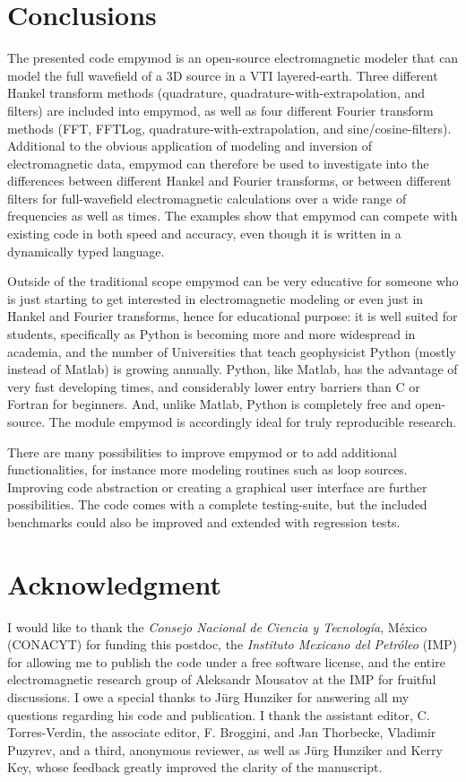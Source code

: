 \documentclass[manuscript,revised]{geophysics}
\begin{document}
\section{Conclusions}

The presented code empymod is an open-source electromagnetic modeler that can
model the full wavefield of a 3D source in a VTI layered-earth. Three different
Hankel transform methods (quadrature, quadrature-with-extrapolation, and
filters) are included into empymod, as well as four different Fourier transform
methods (FFT, FFTLog, quadrature-with-extrapolation, and sine/cosine-filters).
Additional to the obvious application of modeling and inversion of
electromagnetic data, empymod can therefore be used to investigate into the
differences between different Hankel and Fourier transforms, or between
different filters for full-wavefield electromagnetic calculations over a wide
range of frequencies as well as times. The examples show that empymod can
compete with existing code in both speed and accuracy, even though it is
written in a dynamically typed language.

Outside of the traditional scope empymod can be very educative for someone who
is just starting to get interested in electromagnetic modeling or even just in
Hankel and Fourier transforms, hence for educational purpose: it is well suited
for students, specifically as Python is becoming more and more widespread in
academia, and the number of Universities that teach geophysicist Python (mostly
instead of Matlab) is growing annually. Python, like Matlab, has the advantage
of very fast developing times, and considerably lower entry barriers than C or
Fortran for beginners. And, unlike Matlab, Python is completely free and
open-source. The module empymod is accordingly ideal for truly reproducible
research.

There are many possibilities to improve empymod or to add additional
functionalities, for instance more modeling routines such as loop sources.
Improving code abstraction or creating a graphical user interface are further
possibilities. The code comes with a complete testing-suite, but the included
benchmarks could also be improved and extended with regression tests.


\section{Acknowledgment}

I would like to thank the \emph{Consejo Nacional de Ciencia y Tecnología},
México (CONACYT) for funding this postdoc, the \emph{Instituto Mexicano del
Petróleo} (IMP) for allowing me to publish the code under a free software
license, and the entire electromagnetic research group of Aleksandr Mousatov at
the IMP for fruitful discussions. I owe a special thanks to Jürg Hunziker for
answering all my questions regarding his code and publication. I thank the
assistant editor, C. Torres-Verdin, the associate editor, F. Broggini, and Jan
Thorbecke, Vladimir Puzyrev, and a third, anonymous reviewer, as well as Jürg
Hunziker and Kerry Key, whose feedback greatly improved the clarity of the
manuscript.
\end{document}
